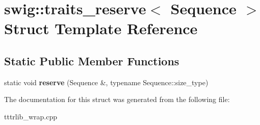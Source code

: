 \hypertarget{structswig_1_1traits__reserve}{}\section{swig\+:\+:traits\+\_\+reserve$<$ Sequence $>$ Struct Template Reference}
\label{structswig_1_1traits__reserve}
\subsection*{Static Public Member Functions}
\begin{DoxyCompactItemize}
\item 
\mbox{\label{structswig_1_1traits__reserve_ab18d7d0017918873e958b9745c0d2709}} 
static void {\bfseries reserve} (Sequence \&, typename Sequence\+::size\+\_\+type)
\end{DoxyCompactItemize}


The documentation for this struct was generated from the following file\+:\begin{DoxyCompactItemize}
\item 
tttrlib\+\_\+wrap.\+cpp\end{DoxyCompactItemize}

